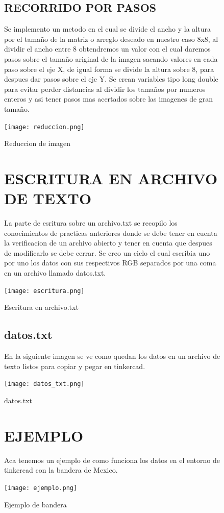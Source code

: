 \documentclass{article}
\begin{document}
\begin{figure} 
\subsection{RECORRIDO POR PASOS}
Se implemento un metodo en el cual se divide el ancho y la altura por el tamaño de la matriz o arreglo deseado en nuestro caso 8x8, al dividir el ancho entre 8 obtendremos un valor con el cual daremos pasos sobre el tamaño ariginal de la imagen sacando valores en cada paso sobre el eje X, de igual forma se divide la altura sobre 8, para despues dar pasos sobre el eje Y.
Se crean variables tipo long double para evitar perder distancias al dividir los tamaños por numeros enteros y asi tener pasos mas acertados sobre las imagenes de gran tamaño.

    \texttt{[image: reduccion.png]}
    \centering
    \caption{Reduccion de imagen}
    \label{fig:reduccion}
    \end{figure}

\begin{figure} 
\section{ESCRITURA EN ARCHIVO DE TEXTO}
La parte de esritura sobre un archivo.txt se recopilo los conocimientos de practicas anteriores donde se debe tener en cuenta la verificacion de un archivo abierto y tener en cuenta que despues de modificarlo se debe cerrar.
Se creo un ciclo el cual escribia uno por uno los datos con sus respectivos RGB separados por una coma en un archivo llamado datos.txt.

    \texttt{[image: escritura.png]}
    \centering
    \caption{Escritura en archivo.txt}
    \label{fig:escritura}
    \end{figure}
    
\begin{figure}
\subsection{datos.txt}
En la siguiente imagen se ve como quedan los datos en un archivo de texto listos para copiar y pegar en tinkercad.

    \texttt{[image: datos\_txt.png]}
    \centering
    \caption{datos.txt}
    \label{fig:datos_txt}
\end{figure}

\begin{figure} 

\section{EJEMPLO}
Aca tenemos un ejemplo de como funciona los datos en el entorno de tinkercad con la bandera de Mexico.

    \texttt{[image: ejemplo.png]}
    \centering
    \caption{Ejemplo de bandera}
    \label{fig:ejemplo}
    \end{figure}
\end{document}

